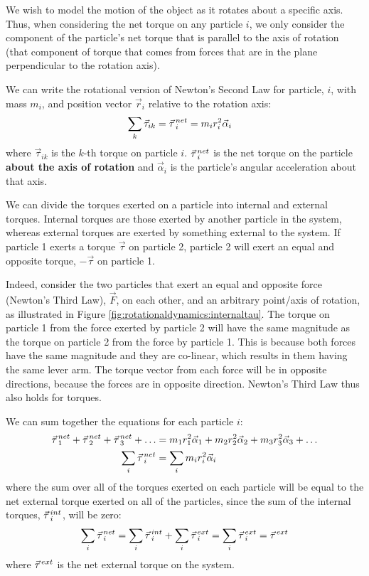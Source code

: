 We wish to model the motion of the object as it rotates about a specific axis. Thus, when considering the net torque on any particle $i$, we only consider the component of the particle's net torque that is parallel to the axis of rotation (that component of torque that comes from forces that are in the plane perpendicular to the rotation axis).

We can write the rotational version of Newton's Second Law for particle, $i$, with mass $m_i$, and position vector $\vec r_i$ relative to the rotation axis:
\begin{align*}
\sum_k \vec\tau_{ik} = \pvec\tau_i^{net} &= m_ir_i^2\vec\alpha_i
\end{align*}
where $\vec\tau_{ik}$ is the $k$-th torque on particle $i$. $\pvec\tau_i^{net}$ is the net torque on the particle \textbf{about the axis of rotation} and $\vec\alpha_i$ is the particle's angular acceleration about that axis.

We can divide the torques exerted on a particle into internal and external torques. Internal torques are those exerted by another particle in the system, whereas external torques are exerted by something external to the system. If particle 1 exerts a torque $\vec\tau$ on particle 2, particle 2 will exert an equal and opposite torque, $-\vec\tau$ on particle 1.

Indeed, consider the two particles that exert an equal and opposite force (Newton's Third Law), $\vec F$, on each other, and an arbitrary point/axis of rotation, as illustrated in Figure \ref{fig:rotationaldynamics:internaltau}. The torque on particle 1 from the force exerted by particle 2 will have the same magnitude as the torque on particle 2 from the force by particle 1. This is because both forces have the same magnitude and they are co-linear, which results in them having the same lever arm. The torque vector from each force will be in opposite directions, because the forces are in opposite direction. Newton's Third Law thus also holds for torques.

We can sum together the equations for each particle $i$:
\begin{align*}
\pvec\tau_1^{net} + \pvec\tau_2^{net} +\pvec\tau_3^{net} + \dots &= m_1r_1^2\vec\alpha_1 + m_2r_2^2\vec\alpha_2 +m_3r_3^2\vec\alpha_3 +\dots\\
\sum_i \pvec\tau_i^{net} &= \sum_i  m_ir_i^2\vec\alpha_i
\end{align*}
where the sum over all of the torques exerted on each particle will be equal to the net external torque exerted on all of the particles, since the sum of the internal torques, $\pvec\tau_i^{int}$, will be zero:
\begin{align*}
\sum_i \pvec\tau_i^{net} = \sum_i \pvec\tau_i^{int} + \sum_i \pvec\tau_i^{ext} = \sum_i \pvec\tau_i^{ext} = \pvec\tau^{ext}
\end{align*}
where $ \pvec\tau^{ext}$ is the net external torque on the system.

